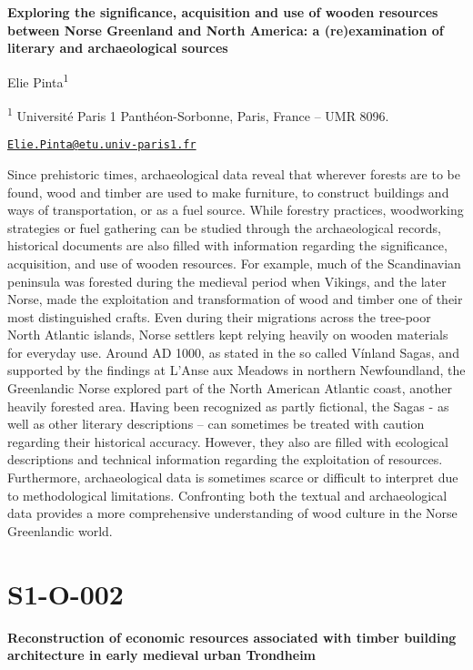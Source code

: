 \documentclass[
]{book}
\begin{document}
\textbf{Exploring the significance, acquisition and use of wooden resources
between Norse Greenland and North America: a (re)examination of literary
and archaeological sources}

Elie Pinta\textsuperscript{1}

\textsuperscript{1} Université Paris 1 Panthéon-Sorbonne, Paris, France -- UMR 8096.

\href{mailto:Elie.Pinta@etu.univ-paris1.fr}{\nolinkurl{Elie.Pinta@etu.univ-paris1.fr}}

Since prehistoric times, archaeological data reveal that wherever
forests are to be found, wood and timber are used to make furniture, to
construct buildings and ways of transportation, or as a fuel source.
While forestry practices, woodworking strategies or fuel gathering can
be studied through the archaeological records, historical documents are
also filled with information regarding the significance, acquisition,
and use of wooden resources. For example, much of the Scandinavian
peninsula was forested during the medieval period when Vikings, and the
later Norse, made the exploitation and transformation of wood and timber
one of their most distinguished crafts. Even during their migrations
across the tree-poor North Atlantic islands, Norse settlers kept relying
heavily on wooden materials for everyday use. Around AD 1000, as stated
in the so called Vínland Sagas, and supported by the findings at L'Anse
aux Meadows in northern Newfoundland, the Greenlandic Norse explored
part of the North American Atlantic coast, another heavily forested
area. Having been recognized as partly fictional, the Sagas - as well as
other literary descriptions -- can sometimes be treated with caution
regarding their historical accuracy. However, they also are filled with
ecological descriptions and technical information regarding the
exploitation of resources. Furthermore, archaeological data is sometimes
scarce or difficult to interpret due to methodological limitations.
Confronting both the textual and archaeological data provides a more
comprehensive understanding of wood culture in the Norse Greenlandic
world.

\hypertarget{s1-o-002}{%
\section*{S1-O-002}\label{s1-o-002}}

\textbf{Reconstruction of economic resources associated with timber building
architecture in early medieval urban Trondheim}
\end{document}
